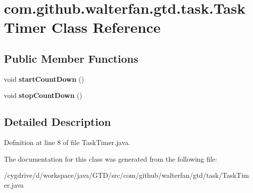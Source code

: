 \hypertarget{classcom_1_1github_1_1walterfan_1_1gtd_1_1task_1_1TaskTimer}{\section{com.\-github.\-walterfan.\-gtd.\-task.\-Task\-Timer Class Reference}
\label{classcom_1_1github_1_1walterfan_1_1gtd_1_1task_1_1TaskTimer}
}
\subsection*{Public Member Functions}
\begin{DoxyCompactItemize}
\item 
\hypertarget{classcom_1_1github_1_1walterfan_1_1gtd_1_1task_1_1TaskTimer_aaef721eae0f9573d9be02ca8a837b18c}{void {\bfseries start\-Count\-Down} ()}\label{classcom_1_1github_1_1walterfan_1_1gtd_1_1task_1_1TaskTimer_aaef721eae0f9573d9be02ca8a837b18c}

\item 
\hypertarget{classcom_1_1github_1_1walterfan_1_1gtd_1_1task_1_1TaskTimer_a624a14c9d1f28ac2cd058f36d2b0ccac}{void {\bfseries stop\-Count\-Down} ()}\label{classcom_1_1github_1_1walterfan_1_1gtd_1_1task_1_1TaskTimer_a624a14c9d1f28ac2cd058f36d2b0ccac}

\end{DoxyCompactItemize}


\subsection{Detailed Description}


Definition at line 8 of file Task\-Timer.\-java.



The documentation for this class was generated from the following file\-:\begin{DoxyCompactItemize}
\item 
/cygdrive/d/workspace/java/\-G\-T\-D/src/com/github/walterfan/gtd/task/Task\-Timer.\-java\end{DoxyCompactItemize}
